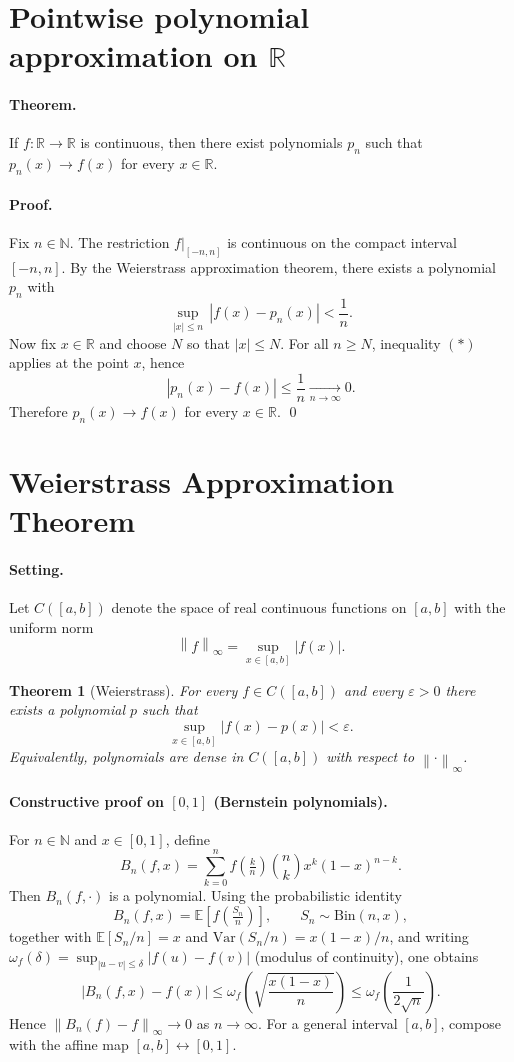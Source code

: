\documentclass[11pt,a4paper]{article}
\newtheorem{theorem}{Theorem}
\theoremstyle{definition}
\theoremstyle{definition}
\theoremstyle{plain}
\theoremstyle{remark}
\newcommand{\norm}[1]{\left\lVert #1 \right\rVert}
\begin{document}
\section*{Pointwise polynomial approximation on \(\mathbb{R}\)}
\paragraph{Theorem.}
If \(f:\mathbb{R}\to\mathbb{R}\) is continuous, then there exist polynomials \(p_n\) such that
\(p_n(x)\to f(x)\) for every \(x\in\mathbb{R}\).

\paragraph{Proof.}
Fix \(n\in\mathbb{N}\). The restriction \(f|_{[-n,n]}\) is continuous on the compact interval \([-n,n]\).
By the Weierstrass approximation theorem, there exists a polynomial \(p_n\) with
\[
\sup_{|x|\le n}\,|f(x)-p_n(x)|<\frac{1}{n}.
\tag{$\ast$}
\]
Now fix \(x\in\mathbb{R}\) and choose \(N\) so that \(|x|\le N\).
For all \(n\ge N\), inequality \((\ast)\) applies at the point \(x\), hence
\[
|p_n(x)-f(x)|\le \frac{1}{n}\xrightarrow[n\to\infty]{}0.
\]
Therefore \(p_n(x)\to f(x)\) for every \(x\in\mathbb{R}\).
\qed

\section*{Weierstrass Approximation Theorem}

\paragraph{Setting.}
Let \(C([a,b])\) denote the space of real continuous functions on \([a,b]\) with the uniform norm
\[
\norm{f}_\infty=\sup_{x\in[a,b]} |f(x)|.
\]

\begin{theorem}[Weierstrass]
	For every \(f\in C([a,b])\) and every \(\varepsilon>0\) there exists a polynomial \(p\) such that
	\[
	\sup_{x\in[a,b]} |f(x)-p(x)|<\varepsilon.
	\]
	Equivalently, polynomials are dense in \(C([a,b])\) with respect to \(\norm{\cdot}_\infty\).
\end{theorem}

\paragraph{Constructive proof on \([0,1]\) (Bernstein polynomials).}
For \(n\in\mathbb N\) and \(x\in[0,1]\), define
\[
B_n(f,x)=\sum_{k=0}^{n} f\!\left(\tfrac{k}{n}\right)\binom{n}{k} x^{k}(1-x)^{n-k}.
\]
Then \(B_n(f,\cdot)\) is a polynomial. Using the probabilistic identity
\[
B_n(f,x)=\mathbb E\!\left[f\!\left(\tfrac{S_n}{n}\right)\right],\qquad S_n\sim\mathrm{Bin}(n,x),
\]
together with \(\mathbb E[S_n/n]=x\) and \(\mathrm{Var}(S_n/n)=x(1-x)/n\), and writing
\(\omega_f(\delta)=\sup_{|u-v|\le \delta}|f(u)-f(v)|\) (modulus of continuity), one obtains
\[
|B_n(f,x)-f(x)|\le \omega_f\!\left(\sqrt{\frac{x(1-x)}{n}}\right)\le \omega_f\!\left(\frac{1}{2\sqrt{n}}\right).
\]
Hence \(\norm{B_n(f)-f}_\infty\to0\) as \(n\to\infty\).
For a general interval \([a,b]\), compose with the affine map \([a,b]\leftrightarrow[0,1]\).
\end{document}
